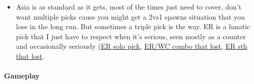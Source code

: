 \begin{itemize}
    \item Asia is as standard as it gets, most of the times just need to cover, don't want multiple picks cause you might get a 2vs1 spawns situation that you lose in the long run. But sometimes a triple pick is the way. ER is a lunatic pick that I just have to respect when it's serious, seen mostly as a counter and occasionally seriously (\href{https://www.warzone.com/MultiPlayer?GameID=29448473}{ER solo pick}, \href{https://www.warzone.com/MultiPlayer?GameID=27678812}{ER/WC combo that lost}, \href{https://www.warzone.com/MultiPlayer?GameID=23693150}{ER sth that lost}.
\end{itemize}


\paragraph{Gameplay}


